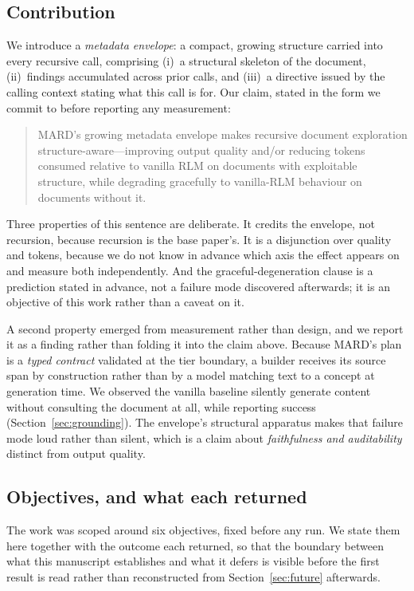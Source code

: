 \documentclass[conference]{IEEEtran}
\begin{document}
\subsection{Contribution}
We introduce a \emph{metadata envelope}: a compact, growing structure carried
into every recursive call, comprising (i)~a structural skeleton of the
document, (ii)~findings accumulated across prior calls, and (iii)~a directive
issued by the calling context stating what this call is for. Our claim,
stated in the form we commit to before reporting any measurement:

\begin{quote}
MARD's growing metadata envelope makes recursive document exploration
structure-aware---improving output quality and/or reducing tokens consumed
relative to vanilla RLM on documents with exploitable structure, while
degrading gracefully to vanilla-RLM behaviour on documents without it.
\end{quote}

Three properties of this sentence are deliberate. It credits the envelope,
not recursion, because recursion is the base paper's. It is a disjunction
over quality and tokens, because we do not know in advance which axis the
effect appears on and measure both independently. And the
graceful-degeneration clause is a prediction stated in advance, not a failure
mode discovered afterwards; it is an objective of this work rather than a
caveat on it.

A second property emerged from measurement rather than design, and we report
it as a finding rather than folding it into the claim above. Because MARD's
plan is a \emph{typed contract} validated at the tier boundary, a builder
receives its source span by construction rather than by a model matching text
to a concept at generation time. We observed the vanilla baseline silently
generate content without consulting the document at all, while reporting
success (Section~\ref{sec:grounding}). The envelope's structural apparatus
makes that failure mode loud rather than silent, which is a claim about
\emph{faithfulness and auditability} distinct from output quality.

\subsection{Objectives, and what each returned}
\label{sec:objectives}
The work was scoped around six objectives, fixed before any run. We state
them here together with the outcome each returned, so that the boundary
between what this manuscript establishes and what it defers is visible
before the first result is read rather than reconstructed from
Section~\ref{sec:future} afterwards.
\end{document}
